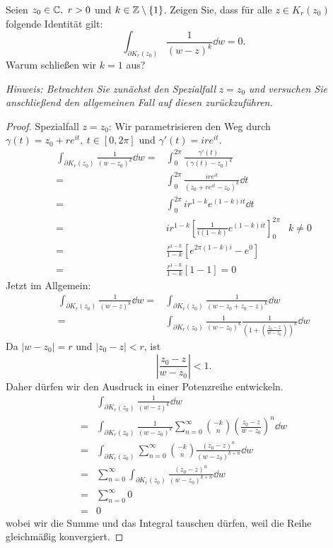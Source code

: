 \begin{Problem}\label{pr:complexanal4-3}
	Seien $z_0\in \mathbb{C},~r>0$ und $k\in \mathbb{Z}\setminus \{1\} $. Zeigen Sie, dass f\"{u}r alle $z\in K_r(z_0)$ folgende Identität gilt:
	\[
		\int_{\partial K_r(z_0)}\frac{1}{(w-z)^k}\dd{w}=0
	.\] 
	Warum schließen wir $k=1$ aus?

	\emph{Hinweis: Betrachten Sie zunächst den Spezialfall} $z=z_0$ \emph{und versuchen Sie anschließend den allgemeinen Fall auf diesen zurückzuführen.}
\end{Problem}
\begin{proof}
	Spezialfall $z=z_0$: Wir parametrisieren den Weg durch $\gamma(t)= z_0+ re^{it},~t\in [0,2\pi]$ und $\gamma'(t) = i re^{it}$. 
\begin{align*}
	\int_{\partial K_r(z_0)} \frac{1}{(w-z_0)^k}\dd{w}=& \int_0^{2\pi} \frac{\gamma'(t)}{(\gamma(t)-z_0)^k}\\
	=&\int_0^{2\pi} \frac{i re^{it}}{(z_0+re^{it}-z_0)^k}\dd{t}\\
	=&\int_0^{2\pi} i r^{1-k} e^{(1-k)it}\dd{t}\\
	=&i r^{1-k} \left[ \frac{1}{i(1-k)}e^{(1-k)it} \right]_0^{2\pi} & k\neq 0\\
	=& \frac{r^{1-k}}{1-k}\left[ e^{2\pi(1-k)i} - e^{0} \right] \\
	=& \frac{r^{1-k}}{1-k}\left[ 1- 1\right] =0
\end{align*}
Jetzt im Allgemein:
\begin{align*}
	\int_{\partial K_r(z_0)}\frac{1}{(w-z)^k}\dd{w}=&\int_{\partial K_r(z_0)}\frac{1}{(w-z_0+z_0-z)^k}\dd{w}\\
	=&\int_{\partial K_r(z_0)}\frac{1}{(w-z_0)^k}\frac{1}{\left( 1+\left( \frac{z_0-z}{w-z_0} \right) \right)^k}\dd{w}
\end{align*}
Da $|w-z_0|=r$ und $|z_0-z|<r$, ist
\[
 \left|\frac{z_0-z}{w-z_0} \right| <1
.\]
Daher dürfen wir den Ausdruck in einer Potenzreihe entwickeln.
\begin{align*}
&	\int_{\partial K_r(z_0)} \frac{1}{(w-z)^k}\dd{w}
\\=&\int_{\partial K_r(z_0)}\frac{1}{(w-z_0)^k}\sum_{n=0}^\infty \binom{-k}{n}\left( \frac{z_0-z}{w-z_0} \right)^n\dd{w}\\
=&\int_{\partial K_r(z_0)}\sum_{n=0}^\infty \binom{-k}{n} \frac{(z_0-z)^n}{(w-z_0)^{k+n}}\dd{w}\\
=&\sum_{n=0}^\infty \int_{\partial K_r(z_0)} \frac{(z_0-z)^n}{(w-z_0)^{k+n}}\dd{w}\\
=& \sum_{n=0}^\infty 0\\
=&0
\end{align*}
wobei wir die Summe und das Integral tauschen dürfen, weil die Reihe gleichmäßig konvergiert.
\end{proof}

